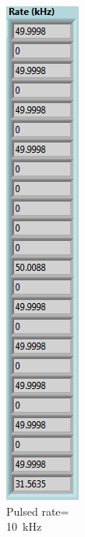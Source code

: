 \begin{figure}[H]
\begin{minipage}{0.24\textwidth}
		\caption{Pulsed rate=\\10~kHz}
		\label{fig:10khz}
	\end{minipage}
	\begin{minipage}{0.24\textwidth}
		\centering
		\includegraphics[width=.7\linewidth]{IMG/ch5/latch_tests/fig17}

\end{minipage}
\end{figure}
